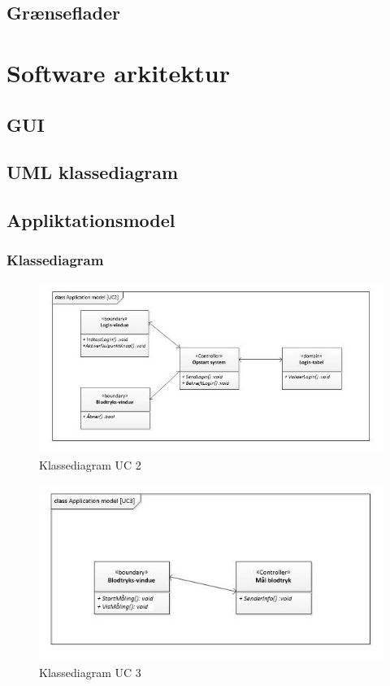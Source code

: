 \subsection{Grænseflader}

\section{Software arkitektur}

\subsection{GUI}

\subsection{UML klassediagram}


\subsection{Appliktationsmodel}

\subsubsection{Klassediagram}

\begin{figure}[H]
	\includegraphics[width=1\textwidth]{Figurer/classAppModelUC2}
	\caption{Klassediagram UC 2}
	\label{classApp UC2}
\end{figure}

\begin{figure}[H]
	\includegraphics[width=1\textwidth]{Figurer/classAppModelUC3}
	\caption{Klassediagram UC 3}
	\label{classApp UC3}
\end{figure}

